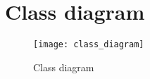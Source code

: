 \appendix
\chapter{Class diagram}
\begin{figure}[h!]
	\centering
	\texttt{[image: class\_diagram]}
	\caption{Class diagram}
	\label{fig:class_diagram}
\end{figure}

